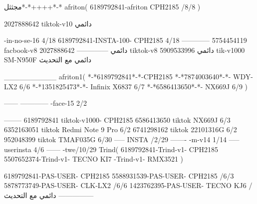مجثثل*-*++++*-*
afriton(
6189792841-afriton CPH2185  /8/8
)

2027888642 tiktok-v10
دائمي

-in-no-se-16 4/18
6189792841-INSTA-100- CPH2185 4/18
------------
5754454119 facbook-v8
دائمي
--------------
2027888642 tiktok-v8
دائمي
5909533996 tik-v1000  SM-N950F
دائمي مع التحديث

__________
afriton1(
*-*6189792841*-*-CPH2185
*-*7874003640*-*- WDY-LX2  6/6
*-*1351825473*-*- Infinix X6837  6/7
*-*6586413650*-*- NX669J  6/9
)


------
------------
-face-15 2/2

--------
6189792841 tiktok-v1000- CPH2185 
6586413650 tiktok NX669J  6/3
6352163051 tiktok  Redmi Note 9 Pro   6/2
6741298162 tiktok 22101316G  6/2
952048399 tiktok TMAF035G  6/30
-----
 INSTA /2/29
-------
-m-v14 1/14
-----
userinsta 4/6
------
-twe/10/29
Trind(
6189792841-Trind-v1- CPH2185 
5507652374-Trind-v1- TECNO KI7 \6-Trind-v1- RMX3521 \6\7
)


6189792841-PAS-USER- CPH2185 
5588931539-PAS-USER- CPH2185  /6/3
5878773749-PAS-USER- CLK-LX2  /6/6
1423762395-PAS-USER- TECNO KJ6  /دائمي مع التحديث
    ---------------
